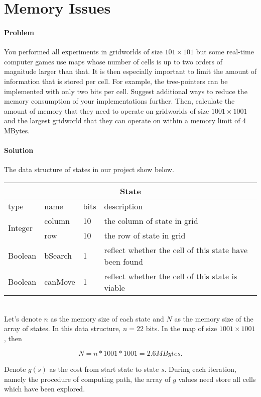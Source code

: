 \section{Memory Issues}

\paragraph{Problem}
You performed all experiments in gridworlds of size $101\times 101$ but some
real-time computer games use maps whose number of cells is up to two orders of
magnitude larger than that. It is then especially important to limit the amount
of information that is stored per cell. For example, the tree-pointers can be
implemented with only two bits per cell. Suggest additional ways to reduce the
memory consumption of your implementations further. Then, calculate the amount
of memory that they need to operate on gridworlds of size $1001\times 1001$ and
the largest gridworld that they can operate on within a memory limit of 4
MBytes.

\paragraph{Solution}
The data structure of states in our project show below.

\begin{tabular}{|l|l|l|l|}
\hline
\multicolumn{4}{|c|}{State}\\
\hline
type&name&bits&description\\
\hline
\multirow{2}{*}{Integer}
&column&10&the column of state in grid\\
&row&10&the row of state in grid\\
\hline
Boolean&bSearch&1&reflect whether the cell of this state have been found\\
\hline
Boolean&canMove&1&reflect whether the cell of this state is viable\\
\hline
\end{tabular}\\

Let's denote $n$ as the memory size of each state and $N$ as the memory size of
the array of states. In this data structure, $n = 22$ bits. In the map of size
$1001 \times 1001$, then

\begin{equation*}
  N = n*1001*1001 = 2.6 MBytes.
\end{equation*}

Denote $g(s)$ as the cost from start state to state $s$. During each iteration,
namely the procedure of computing path, the array of $g$ values need store all
cells which have been explored. 

